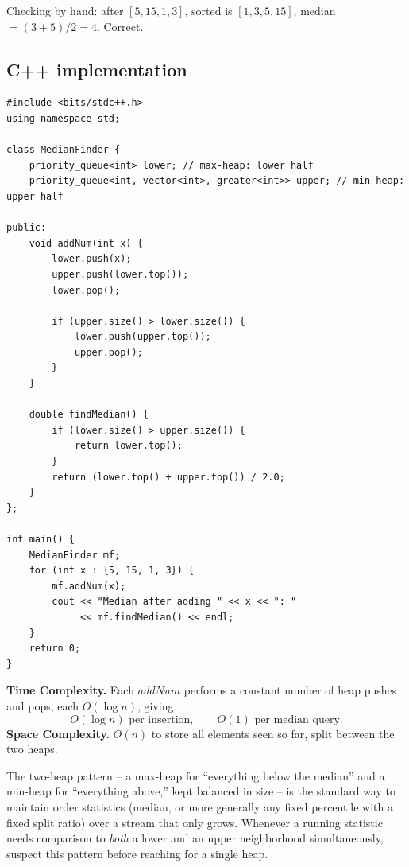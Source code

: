 Checking by hand: after $[5,15,1,3]$, sorted is $[1,3,5,15]$, median
$=(3+5)/2=4$. Correct.

\subsection*{C++ implementation}

\begin{lstlisting}
#include <bits/stdc++.h>
using namespace std;

class MedianFinder {
    priority_queue<int> lower; // max-heap: lower half
    priority_queue<int, vector<int>, greater<int>> upper; // min-heap: upper half

public:
    void addNum(int x) {
        lower.push(x);
        upper.push(lower.top());
        lower.pop();

        if (upper.size() > lower.size()) {
            lower.push(upper.top());
            upper.pop();
        }
    }

    double findMedian() {
        if (lower.size() > upper.size()) {
            return lower.top();
        }
        return (lower.top() + upper.top()) / 2.0;
    }
};

int main() {
    MedianFinder mf;
    for (int x : {5, 15, 1, 3}) {
        mf.addNum(x);
        cout << "Median after adding " << x << ": "
             << mf.findMedian() << endl;
    }
    return 0;
}
\end{lstlisting}

\begin{complexitybox}
\textbf{Time Complexity.} Each $\textit{addNum}$ performs a constant
number of heap pushes and pops, each $O(\log n)$, giving
\[
  O(\log n) \text{ per insertion}, \qquad O(1) \text{ per median query}.
\]
\textbf{Space Complexity.} $O(n)$ to store all elements seen so far,
split between the two heaps.
\end{complexitybox}

\begin{takeawaybox}
The two-heap pattern -- a max-heap for ``everything below the median'' and
a min-heap for ``everything above,'' kept balanced in size -- is the
standard way to maintain order statistics (median, or more generally any
fixed percentile with a fixed split ratio) over a stream that only grows.
Whenever a running statistic needs comparison to \emph{both} a lower and
an upper neighborhood simultaneously, suspect this pattern before reaching
for a single heap.
\end{takeawaybox}
